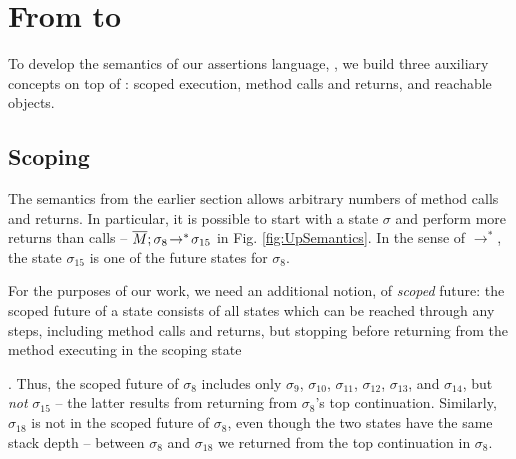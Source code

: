 

\section{From \LangOO to \AssertLang}

{To develop the semantics of our assertions language, \AssertLang, we   build three auxiliary concepts on  top of  \LangOO: scoped execution, method calls and returns, and reachable objects.}


  
  
 \subsection{Scoping}
 \label{sect:bounded}

{The semantics from the earlier section allows arbitrary numbers of method calls and returns. 
In particular, it is possible to start with a state $\sigma$ and perform more returns than calls --
\eg $\overline{M};\sigma_{8}\! \rightarrow^*\! {\sigma_{15}}$  in  Fig. \ref{fig:UpSemantics}.
{In the sense of $\rightarrow^*$,  the state $\sigma_{15}$  is one of the future  states for $\sigma_8$.}

 
{For} the purposes of our work, we   need an {additional} notion, of  \emph{scoped} future:  
the scoped future of a state consists of all states which  can be reached through any   
 steps, including method calls and returns, but   {stopping before returning}   
from the method executing in the scoping state}. 
Thus, the {scoped} future  of $\sigma_8$   includes only
  $\sigma_9$, $\sigma_{10}$, $\sigma_{11}$, $\sigma_{12}$, $\sigma_{13}$, and $\sigma_{14}$, but \emph{not} $\sigma_{15}$  -- the latter results from returning from $\sigma_{8}$'s top continuation.  
 {Similarly, $\sigma_{18}$ is not in the scoped future of $\sigma_8$, even though the two states have the same stack depth -- between $\sigma_{8}$  and  $\sigma_{18}$ we returned from the top continuation in $\sigma_{8}$.}
 
